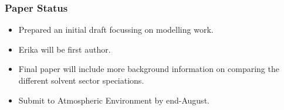 {
    \begin{frame}[plain]
    \end{frame}
}

\begin{frame}
    \frametitle{Paper Status}

    \vspace{-1cm}
    \begin{itemize}
        \item Prepared an initial draft focussing on modelling work. \vspace{5mm}
        \item Erika will be first author.  \vspace{5mm}
        \item Final paper will include more background information on comparing the different solvent sector speciations. \vspace{5mm}
        \item Submit to Atmospheric Environment by end-August.
    \end{itemize}
\end{frame}
